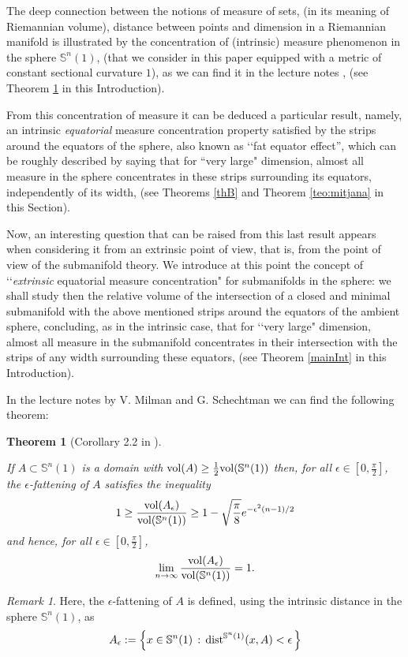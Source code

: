 \documentclass{amsart}
\newtheorem{theoremA}{Theorem}
\theoremstyle{definition}
\theoremstyle{remark}
\newtheorem{remark}[theorem]{Remark}
\newcommand{\ese}{\mathbb{S}}
\begin{document}
The deep connection between the notions of measure of sets, (in its meaning of Riemannian volume), distance between points and dimension in a Riemannian manifold is illustrated by the concentration of (intrinsic) measure phenomenon in the sphere $\ese^n(1)$, (that we consider in this paper equipped with a metric of constant sectional curvature $1$), as we can find it in the lecture notes \cite{MS}, (see Theorem \ref{measurecon} in this Introduction).

From this concentration of measure  it can be deduced a particular result, namely, an intrinsic {\em equatorial} measure concentration property satisfied by the strips around the equators of the sphere, also known as \lq\lq fat equator effect'', which can be roughly described by saying that for ``very large" dimension, almost all measure in the sphere concentrates in these strips surrounding its equators, independently of its width, (see Theorems \ref{thB} and Theorem \ref{teo:mitjana} in this Section). 

Now, an interesting question that can be raised from this last result appears when considering it from an extrinsic point of view, that is, from the point of view of the submanifold theory. 
We introduce at this point  the concept of \lq\lq {\em extrinsic} equatorial measure concentration"  for submanifolds in the sphere: we shall study then the relative volume of the intersection of a closed and minimal submanifold with the above mentioned strips around the equators of the ambient sphere, concluding, as in the intrinsic case, that for \lq\lq very large" dimension, almost all measure in the submanifold concentrates in their intersection with the strips of any width surrounding these equators, (see Theorem \ref{mainInt} in this Introduction). 

In the lecture notes by V. Milman and G. Schechtman \cite{MS} we can find the following theorem:

\begin{theoremA}[Corollary 2.2 in \cite{MS}]\label{measurecon}\

 If $A\subset \mathbb{S}^n(1)$ is a domain with ${\rm vol }(A)\geq \frac{1}{2} {\rm vol}(\mathbb{S}^n(1))$ then, for all $\epsilon \in [0,\frac{\pi}{2}]$, the  $\epsilon$-fattening of $A$ satisfies the inequality
\begin{equation}\label{eq1}
1 \geq \frac{{\rm vol}(A_\epsilon)}{{\rm vol}(\mathbb{S}^n(1))}\geq 1-\sqrt{\frac{\pi}{8}}e^{-\epsilon^2(n-1)/2}
\end{equation}
\noindent and hence, for all $\epsilon \in [0,\frac{\pi}{2}]$, 
\begin{equation}\label{eq2}
\lim_{n\to \infty} \frac{{\rm vol}(A_\epsilon)}{{\rm vol}(\mathbb{S}^n(1))}= 1.
\end{equation}
\end{theoremA}  
\begin{remark}
Here, the $\epsilon$-fattening of $A$ is defined, using the intrinsic distance in the sphere $\ese^n(1)$, as
$$A_\epsilon:=\left\{x\in \mathbb{S}^n(1)\, :\, {\rm dist}^{\mathbb{S}^n(1)}(x,A)<\epsilon\, \right\}
$$
 \end{remark}
  
\end{document}
